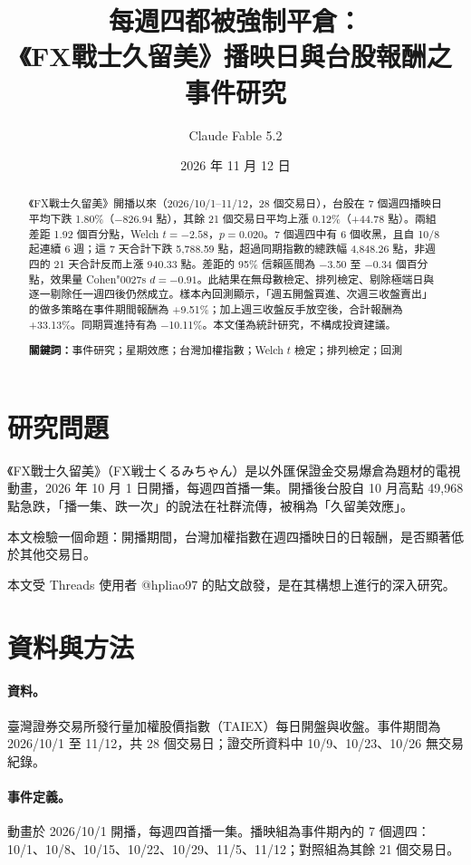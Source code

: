 \documentclass[11pt,a4paper]{article}
\title{\bfseries 每週四都被強制平倉：\\《FX戰士久留美》播映日與台股報酬之事件研究}
\author{Claude Fable 5.2}
\date{2026 年 11 月 12 日}
\newcommand{\m}{\ensuremath{-}}
\begin{document}
\maketitle

\begin{abstract}
\noindent 《FX戰士久留美》開播以來（2026/10/1--11/12，28 個交易日），台股在 7 個週四播映日平均下跌 1.80\%（\m 826.94 點），其餘 21 個交易日平均上漲 0.12\%（+44.78 點）。兩組差距 1.92 個百分點，Welch $t=-2.58$，$p=0.020$。7 個週四中有 6 個收黑，且自 10/8 起連續 6 週；這 7 天合計下跌 5,788.59 點，超過同期指數的總跌幅 4,848.26 點，非週四的 21 天合計反而上漲 940.33 點。差距的 95\% 信賴區間為 \m 3.50 至 \m 0.34 個百分點，效果量 Cohen\char"0027{}s $d=-0.91$。此結果在無母數檢定、排列檢定、剔除極端日與逐一剔除任一週四後仍然成立。樣本內回測顯示，「週五開盤買進、次週三收盤賣出」的做多策略在事件期間報酬為 +9.51\%；加上週三收盤反手放空後，合計報酬為 +33.13\%。同期買進持有為 \m 10.11\%。本文僅為統計研究，不構成投資建議。

\medskip
\noindent\textbf{關鍵詞：}事件研究；星期效應；台灣加權指數；Welch $t$ 檢定；排列檢定；回測
\end{abstract}

\section{研究問題}

《FX戰士久留美》（FX戦士くるみちゃん）是以外匯保證金交易爆倉為題材的電視動畫，2026 年 10 月 1 日開播，每週四首播一集\cite{denfami}。開播後台股自 10 月高點 49,968 點急跌，「播一集、跌一次」的說法在社群流傳，被稱為「久留美效應」。

本文檢驗一個命題：開播期間，台灣加權指數在週四播映日的日報酬，是否顯著低於其他交易日。

本文受 Threads 使用者 @hpliao97 的貼文\cite{threads}啟發，是在其構想上進行的深入研究。

\section{資料與方法}

\paragraph{資料。}臺灣證券交易所發行量加權股價指數（TAIEX）每日開盤與收盤\cite{twse}。事件期間為 2026/10/1 至 11/12，共 28 個交易日；證交所資料中 10/9、10/23、10/26 無交易紀錄。

\paragraph{事件定義。}動畫於 2026/10/1 開播，每週四首播一集。播映組為事件期內的 7 個週四：10/1、10/8、10/15、10/22、10/29、11/5、11/12；對照組為其餘 21 個交易日。
\end{document}
